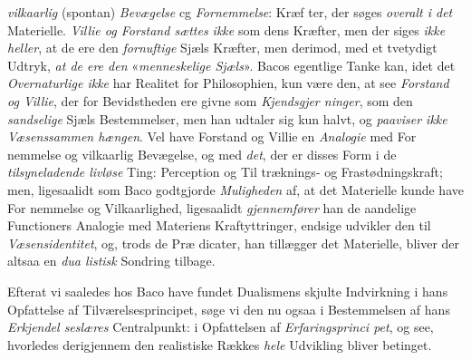 \emph{vilkaarlig} (spontan) \emph{Bevægelse} cg \emph{Fornemmelse}: Kræf\-%
ter, der søges \emph{overalt i det} Materielle. \emph{Villie og Forstand
sættes ikke} som dens Kræfter, men der siges \emph{ikke heller},
at de ere den \emph{fornuftige} Sjæls Kræfter, men derimod, med
et tvetydigt Udtryk, \emph{at de ere den} «\emph{menneskelige Sjæls}».
Bacos egentlige Tanke kan, idet det \emph{Overnaturlige ikke}
har Realitet for Philosophien, kun være den, at see \emph{Forstand
og Villie}, der for Bevidstheden ere givne som \emph{Kjendsgjer\-%
ninger}, som den \emph{sandselige} Sjæls Bestemmelser, men han
udtaler sig kun halvt, og \emph{paaviser ikke Væsenssammen\-%
hængen}. Vel have Forstand og Villie en \emph{Analogie} med For\-%
nemmelse og vilkaarlig Bevægelse, og med \emph{det}, der er disses
Form i de \emph{tilsyneladende livløse} Ting: Perception og Til\-%
træknings- og Frastødningskraft; men, ligesaalidt som Baco
godtgjorde \emph{Muligheden} af, at det Materielle kunde have For\-%
nemmelse og Vilkaarlighed, ligesaalidt \emph{gjennemfører} han de
aandelige Functioners Analogie med Materiens Kraftyttringer,
endsige udvikler den til \emph{Væsensidentitet}, og, trods de Præ\-%
dicater, han tillægger det Materielle, bliver der altsaa en \emph{dua\-%
listisk} Sondring tilbage.

Efterat vi saaledes hos Baco have fundet Dualismens
skjulte Indvirkning i hans Opfattelse af Tilværelsesprincipet,
søge vi den nu ogsaa i Bestemmelsen af hans \emph{Erkjendel\-%
seslæres} Centralpunkt: i Opfattelsen af \emph{Erfaringsprinci\-%
\setcounter{footnote}{0}%
pet}, og see, hvorledes derigjennem den realistiske Rækkes
\emph{hele} Udvikling bliver betinget.

